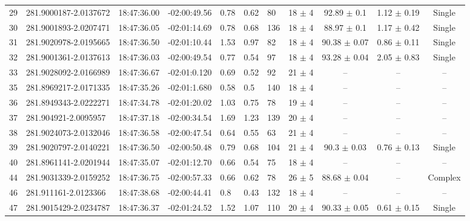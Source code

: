 \documentclass[longauth]{aa} %
\begin{document}
\begin{appendix}
\begin{table}[htp]
\begin{tabular}{llllllllccc}
29  &  281.9000187-2.0137672  &  18:47:36.00  &  -02:00:49.56  &  0.78  &  0.62  &  80  &  18 $\pm$ 4  &  92.89 $\pm$ 0.1  &  1.12 $\pm$ 0.19  &  Single \\
30  &  281.9001893-2.0207471  &  18:47:36.05  &  -02:01:14.69  &  0.78  &  0.68  &  136  &  18 $\pm$ 4  &  88.97 $\pm$ 0.1  &  1.17 $\pm$ 0.42  &  Single \\
31  &  281.9020978-2.0195665  &  18:47:36.50  &  -02:01:10.44  &  1.53  &  0.97  &  82  &  18 $\pm$ 4  &  90.38 $\pm$ 0.07  &  0.86 $\pm$ 0.11  &  Single \\
32  &  281.9001361-2.0137613  &  18:47:36.03  &  -02:00:49.54  &  0.77  &  0.54  &  97  &  18 $\pm$ 4  &  93.28 $\pm$ 0.04  &  2.05 $\pm$ 0.83  &  Single \\
33  &  281.9028092-2.0166989  &  18:47:36.67  &  -02:01:0.120  &  0.69  &  0.52  &  92  &  21 $\pm$ 4  &  --  &  --  &  -- \\
35  &  281.8969217-2.0171335  &  18:47:35.26  &  -02:01:1.680  &  0.58  &  0.5  &  140  &  18 $\pm$ 4  &  --  &  --  &  -- \\
36  &  281.8949343-2.0222271  &  18:47:34.78  &  -02:01:20.02  &  1.03  &  0.75  &  78  &  19 $\pm$ 4  &  --  &  --  &  -- \\
37  &  281.904921-2.0095957  &  18:47:37.18  &  -02:00:34.54  &  1.69  &  1.23  &  139  &  20 $\pm$ 4  &  --  &  --  &  -- \\
38  &  281.9024073-2.0132046  &  18:47:36.58  &  -02:00:47.54  &  0.64  &  0.55  &  63  &  21 $\pm$ 4  &  --  &  --  &  -- \\
39  &  281.9020797-2.0140221  &  18:47:36.50  &  -02:00:50.48  &  0.79  &  0.68  &  104  &  21 $\pm$ 4  &  90.3 $\pm$ 0.03  &  0.76 $\pm$ 0.13  &  Single \\
40  &  281.8961141-2.0201944  &  18:47:35.07  &  -02:01:12.70  &  0.66  &  0.54  &  75  &  18 $\pm$ 4  &  --  &  --  &  -- \\
44  &  281.9031339-2.0159252  &  18:47:36.75  &  -02:00:57.33  &  0.66  &  0.62  &  78  &  26 $\pm$ 5  &  88.68 $\pm$ 0.04  &  --  &  Complex \\
46  &  281.911161-2.0123366  &  18:47:38.68  &  -02:00:44.41  &  0.8  &  0.43  &  132  &  18 $\pm$ 4  &  --  &  --  &  -- \\
47  &  281.9015429-2.0234787  &  18:47:36.37  &  -02:01:24.52  &  1.52  &  1.07  &  110  &  20 $\pm$ 4  &  90.33 $\pm$ 0.05  &  0.61 $\pm$ 0.15  &  Single \\
\hline
\end{tabular}
\end{table}


\end{appendix}
\end{document}
